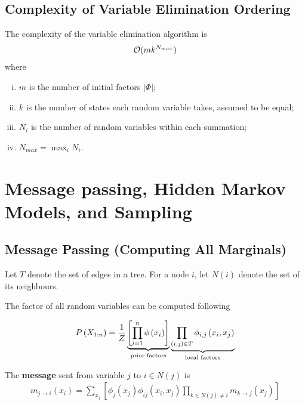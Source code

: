 \documentclass{article}
\begin{document}
	\subsection{Complexity of Variable Elimination Ordering}
	\begin{theorem}
		The complexity of the variable elimination algorithm is
		\begin{align}
			\mathcal{{O}}(m k^{N_{max}})
		\end{align}
		where
		\begin{enumerate}[(i)]
			\item $m$ is the number of initial factors $|\Phi|$;
			\item $k$ is the number of states each random variable takes, assumed to be equal;
			\item $N_i$ is the number of random variables within each summation;
			\item $N_{max} = \max_i N_i$.
		\end{enumerate}
	\end{theorem}
	
	\section{Message passing, Hidden Markov Models, and Sampling}

	\subsection{Message Passing (Computing All Marginals)}
	
	\begin{notation}
		Let $T$ denote the set of edges in a tree. For a node $i$, let $N(i)$ denote the set of its neighbours.
	\end{notation}
	
	The factor of all random variables can be computed following
	
	\begin{align}
		P\left(X_{1: n}\right)
		=\frac{1}{Z} \underbrace{\left[ \prod_{i=1}^n \phi\left(x_{i}\right)
		\right]}_{\text{{prior factors}}}
		\underbrace{\prod_{(i, j) \in T} \phi_{i, j}\left(x_{i}, x_{j}\right)}_{\text{{local factors}}}
	\end{align}
	
	\begin{definition}
		The \textbf{message} sent from variable $j$ to $i \in N(j)$ is
		\begin{align}
			m_{j \rightarrow i}\left(x_{i}\right)
			=\sum_{x_{j}}
			\left [
			\phi_{j}\left(x_{j}\right) \phi_{i j}\left(x_{i}, x_{j}\right)
			\prod_{k \in N(j) \neq i} m_{k \rightarrow j}\left(x_{j}\right)
			\right ]
		\end{align}
	\end{definition}
	
\end{document}
